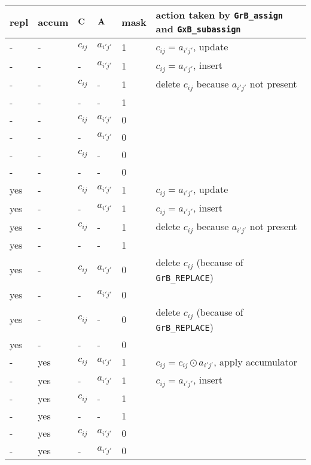 \documentclass[12pt]{article}
\begin{document}
\begin{table}
{\small
\begin{tabular}{lllll|l}
\hline
repl & accum & ${\bf C}$ & ${\bf A}$ & mask & action taken by \verb'GrB_assign' and \verb'GxB_subassign'\\
\hline
    -  &-   & $c_{ij}$ & $a_{i'j'}$  & 1    &  $c_{ij} = a_{i'j'}$, update \\
    -  &-   &  -       & $a_{i'j'}$  & 1    &  $c_{ij} = a_{i'j'}$, insert \\
    -  &-   & $c_{ij}$ &  -          & 1    &  delete $c_{ij}$ because $a_{i'j'}$ not present \\
    -  &-   &  -       &  -          & 1    &   \\
    -  &-   & $c_{ij}$ & $a_{i'j'}$  & 0    &   \\
    -  &-   &  -       & $a_{i'j'}$  & 0    &   \\
    -  &-   & $c_{ij}$ &  -          & 0    &   \\
    -  &-   &  -       &  -          & 0    &   \\
\hline
    yes&-   & $c_{ij}$ & $a_{i'j'}$  & 1    &  $c_{ij} = a_{i'j'}$, update \\
    yes&-   &  -       & $a_{i'j'}$  & 1    &  $c_{ij} = a_{i'j'}$, insert \\
    yes&-   & $c_{ij}$ &  -          & 1    &  delete $c_{ij}$ because $a_{i'j'}$ not present \\
    yes&-   &  -       &  -          & 1    &   \\
    yes&-   & $c_{ij}$ & $a_{i'j'}$  & 0    &  delete $c_{ij}$  (because of \verb'GrB_REPLACE') \\
    yes&-   &  -       & $a_{i'j'}$  & 0    &   \\
    yes&-   & $c_{ij}$ &  -          & 0    &  delete $c_{ij}$  (because of \verb'GrB_REPLACE') \\
    yes&-   &  -       &  -          & 0    &   \\
\hline
    -  &yes & $c_{ij}$ & $a_{i'j'}$  & 1    &  $c_{ij} = c_{ij} \odot a_{i'j'}$, apply accumulator \\
    -  &yes &  -       & $a_{i'j'}$  & 1    &  $c_{ij} = a_{i'j'}$, insert \\
    -  &yes & $c_{ij}$ &  -          & 1    &   \\
    -  &yes &  -       &  -          & 1    &   \\
    -  &yes & $c_{ij}$ & $a_{i'j'}$  & 0    &   \\
    -  &yes &  -       & $a_{i'j'}$  & 0    &   \\

\end{tabular}}
\end{table}
\end{document}
